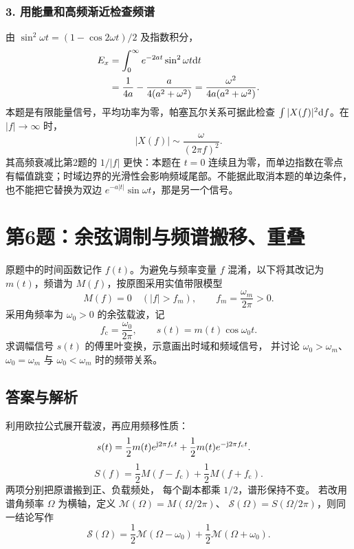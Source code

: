 \subsubsection*{3. 用能量和高频渐近检查频谱}
由 $\sin^2\omega t=(1-\cos2\omega t)/2$ 及指数积分，
\begin{align*}
E_x&=\int_0^\infty e^{-2at}\sin^2\omega t\mathrm{d} t\\
&=\frac1{4a}-\frac{a}{4(a^2+\omega^2)}
=\frac{\omega^2}{4a(a^2+\omega^2)}.
\end{align*}
本题是有限能量信号，平均功率为零，帕塞瓦尔关系可据此检查 $\int|X(f)|^2\mathrm{d} f$。在 $|f|\to\infty$ 时，
\[
|X(f)|\sim\frac{\omega}{(2\pi f)^2}.
\]
其高频衰减比第2题的 $1/|f|$ 更快：本题在 $t=0$ 连续且为零，而单边指数在零点有幅值跳变；时域边界的光滑性会影响频域尾部。不能据此取消本题的单边条件，也不能把它替换为双边 $e^{-a|t|}\sin\omega t$，那是另一个信号。


\section{第6题：余弦调制与频谱搬移、重叠}
\label{hw:2-6}

\begin{hwquestion}
原题中的时间函数记作 $f(t)$。为避免与频率变量 $f$ 混淆，以下将其改记为 $m(t)$，频谱为 $M(f)$，按原图采用实值带限模型
    \[
        M(f)=0\quad(|f|>f_m),
        \qquad f_m=\frac{\omega_m}{2\pi}>0.
    \]
    采用角频率为 $\omega_0>0$ 的余弦载波，记
    \[
        f_{\mathrm c}=\frac{\omega_0}{2\pi},
        \qquad s(t)=m(t)\cos\omega_0t.
    \]
    求调幅信号 $s(t)$ 的傅里叶变换，示意画出时域和频域信号，
    并讨论 $\omega_0>\omega_m$、$\omega_0=\omega_m$
    与 $\omega_0<\omega_m$ 时的频带关系。
\end{hwquestion}

\subsection*{答案与解析}
利用欧拉公式展开载波，再应用频移性质：
\begin{align*}
    s(t)
    &=\frac12m(t)e^{\mathrm{j}2\pi f_{\mathrm c}t}
      +\frac12m(t)e^{-\mathrm{j}2\pi f_{\mathrm c}t}.
\end{align*}
\[
    \boxed{S(f)=\frac12M(f-f_{\mathrm c})
        +\frac12M(f+f_{\mathrm c})}.
\]
两项分别把原谱搬到正、负载频处，
每个副本都乘 $1/2$，谱形保持不变。
若改用谱角频率 $\Omega$ 为横轴，定义
$\mathcal M(\Omega)=M(\Omega/2\pi)$、
$\mathcal S(\Omega)=S(\Omega/2\pi)$，则同一结论写作
\[
    \boxed{\mathcal S(\Omega)
      =\frac12\mathcal M(\Omega-\omega_0)
       +\frac12\mathcal M(\Omega+\omega_0)}.
\]

